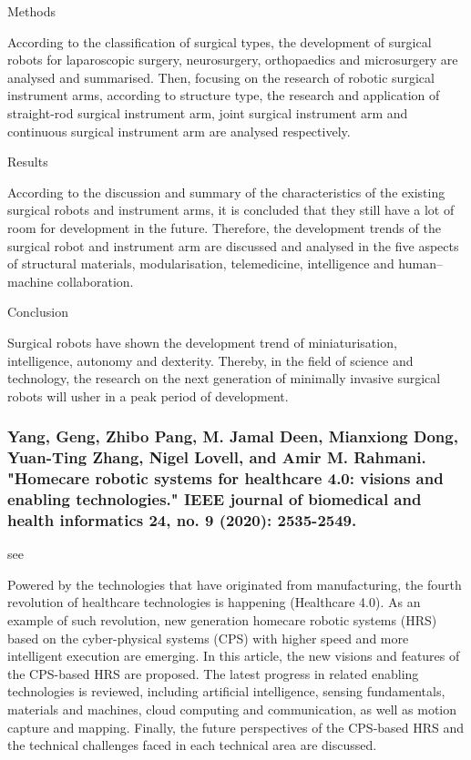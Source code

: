 \documentclass[conference]{IEEEtran}
\begin{document}
Methods

According to the classification of surgical types, the development of surgical robots for laparoscopic surgery, neurosurgery, orthopaedics and microsurgery are analysed and summarised. Then, focusing on the research of robotic surgical instrument arms, according to structure type, the research and application of straight-rod surgical instrument arm, joint surgical instrument arm and continuous surgical instrument arm are analysed respectively.

Results

According to the discussion and summary of the characteristics of the existing surgical robots and instrument arms, it is concluded that they still have a lot of room for development in the future. Therefore, the development trends of the surgical robot and instrument arm are discussed and analysed in the five aspects of structural materials, modularisation, telemedicine, intelligence and human–machine collaboration.

Conclusion

Surgical robots have shown the development trend of miniaturisation, intelligence, autonomy and dexterity. Thereby, in the field of science and technology, the research on the next generation of minimally invasive surgical robots will usher in a peak period of development.

\medskip
\subsubsection{Yang, Geng, Zhibo Pang, M. Jamal Deen, Mianxiong Dong, Yuan-Ting Zhang, Nigel Lovell, and Amir M. Rahmani. "Homecare robotic systems for healthcare 4.0: visions and enabling technologies." IEEE journal of biomedical and health informatics 24, no. 9 (2020): 2535-2549.}
see \cite{yang2020homecare}

Powered by the technologies that have originated from manufacturing, the fourth revolution of healthcare technologies is happening (Healthcare 4.0). As an example of such revolution, new generation homecare robotic systems (HRS) based on the cyber-physical systems (CPS) with higher speed and more intelligent execution are emerging. In this article, the new visions and features of the CPS-based HRS are proposed. The latest progress in related enabling technologies is reviewed, including artificial intelligence, sensing fundamentals, materials and machines, cloud computing and communication, as well as motion capture and mapping. Finally, the future perspectives of the CPS-based HRS and the technical challenges faced in each technical area are discussed.
\end{document}
